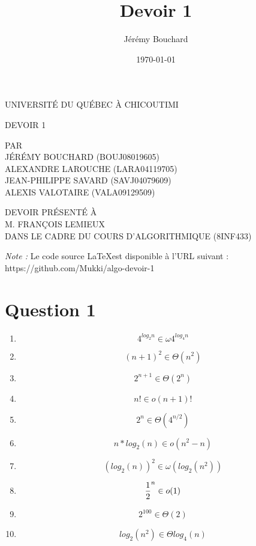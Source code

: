 \documentclass[12pt]{article}
\title{Devoir 1}
\author{Jérémy Bouchard}
\date{\today}
\begin{document}
  \begin{titlepage}
    \doublespacing
    \centering

    UNIVERSITÉ DU QUÉBEC À CHICOUTIMI \\

    \vspace{4.7cm}

    DEVOIR 1 \\

    \vspace{4.7cm}

    PAR \\
    JÉRÉMY BOUCHARD (BOUJ08019605) \\
    ALEXANDRE LAROUCHE (LARA04119705) \\
    JEAN-PHILIPPE SAVARD (SAVJ04079609) \\
    ALEXIS VALOTAIRE (VALA09129509) \\

    \vspace{4.7cm}

    DEVOIR PRÉSENTÉ À \\
    M. FRANÇOIS LEMIEUX \\
    DANS LE CADRE DU COURS D'ALGORITHMIQUE (8INF433)

  \end{titlepage}

  \newpage

  \noindent \textit{Note :} Le code source \LaTeX est disponible à l'URL
  suivant : \\

  https://github.com/Mukki/algo-devoir-1

  \newpage

  \onehalfspacing

  \section*{Question 1}

    \begin{enumerate}[label=(\alph*)]
      \item \[ 4 ^ {log_2 n} \in \omega 4 ^ {log_4 n} \]
      \item \[ (n + 1) ^ {2} \in \Theta (n ^ 2) \]
      \item \[ 2 ^ {n + 1} \in \Theta (2 ^ n) \]
      \item \[ n! \in o (n + 1)! \]
      \item \[ 2 ^ n \in \Theta (4 ^ {n / 2}) \]
      \item \[ n*log_2(n) \in o (n ^ 2 - n) \]
      \item \[ (log_2(n)) ^ 2 \in \omega (log_2(n^2)) \]
      \item \[ {1 \over 2} ^ {n} \in o (1) \]
      \item \[ 2^{100} \in \Theta(2) \]
      \item \[ log_2(n^2) \in \Theta log_4(n) \]
    \end{enumerate}
\end{document}
